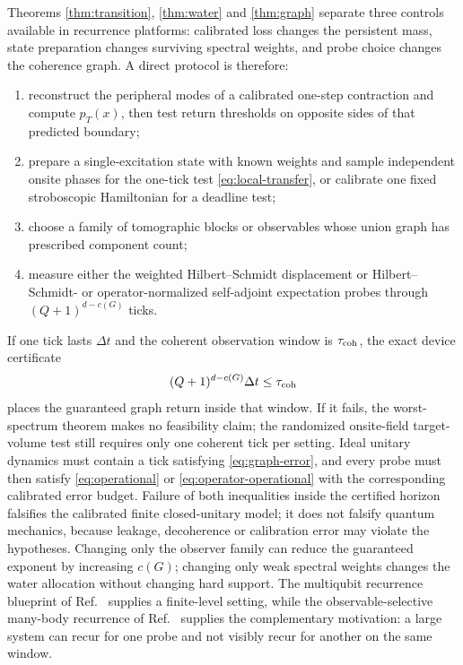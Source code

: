 \documentclass[10pt]{article}
\theoremstyle{definition}
\begin{document}
Theorems \ref{thm:transition}, \ref{thm:water} and \ref{thm:graph} separate
three controls available in recurrence platforms: calibrated loss changes
the persistent mass, state preparation changes surviving spectral weights,
and probe choice changes the coherence graph.  A direct protocol is
therefore:
\begin{enumerate}[leftmargin=2.1em]
 \item reconstruct the peripheral modes of a calibrated one-step contraction
 and compute \(p_T(x)\), then test return thresholds on opposite sides of
 that predicted boundary;
 \item prepare a single-excitation state with known weights and sample
 independent onsite phases for the one-tick test \eqref{eq:local-transfer},
 or calibrate one fixed stroboscopic Hamiltonian for a deadline test;
 \item choose a family of tomographic blocks or observables whose union graph
 has prescribed component count;
 \item measure either the weighted Hilbert--Schmidt displacement or
Hilbert--Schmidt- or operator-normalized self-adjoint expectation probes through
 \((Q+1)^{d-c(G)}\) ticks.
\end{enumerate}
If one tick lasts \(\Delta t\) and the coherent observation window is
\(\tau_{\rm coh}\), the exact device certificate
\begin{equation}
 (Q+1)^{d-c(G)}\Delta t\leq\tau_{\rm coh}
\label{eq:device-window}
\end{equation}
places the guaranteed graph return inside that window.  If it fails, the
worst-spectrum theorem makes no feasibility claim; the randomized
onsite-field target-volume test still requires only one coherent tick per
setting.
Ideal unitary dynamics must contain a tick satisfying
\eqref{eq:graph-error}, and every probe must then satisfy
\eqref{eq:operational} or \eqref{eq:operator-operational} with the
corresponding calibrated error budget.  Failure of
both inequalities inside the certified horizon falsifies the calibrated
finite closed-unitary model; it does not falsify quantum mechanics, because
leakage, decoherence or calibration error may violate the hypotheses.
Changing only the observer family can reduce the guaranteed exponent by
increasing \(c(G)\); changing only weak spectral weights changes the water
allocation without changing hard support.  The
multiqubit recurrence blueprint of Ref.~\cite{KarimiEtAl2026} supplies a
finite-level setting, while the observable-selective many-body recurrence of
Ref.~\cite{RauerEtAl2018} supplies the complementary motivation: a large
system can recur for one probe and not visibly recur for another on the same
window.
\end{document}
